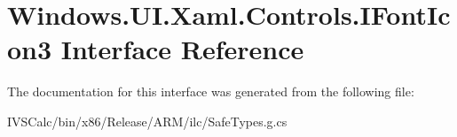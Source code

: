 \hypertarget{interface_windows_1_1_u_i_1_1_xaml_1_1_controls_1_1_i_font_icon3}{}\section{Windows.\+U\+I.\+Xaml.\+Controls.\+I\+Font\+Icon3 Interface Reference}
\label{interface_windows_1_1_u_i_1_1_xaml_1_1_controls_1_1_i_font_icon3}


The documentation for this interface was generated from the following file\+:\begin{DoxyCompactItemize}
\item 
I\+V\+S\+Calc/bin/x86/\+Release/\+A\+R\+M/ilc/Safe\+Types.\+g.\+cs\end{DoxyCompactItemize}
